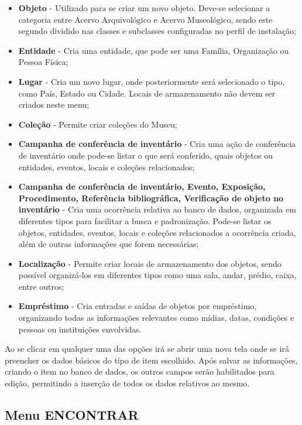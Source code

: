 \documentclass[a4paper,12pt,oneside,onecolumn,final,fleqn]{repUERJ}
\begin{document}
\begin{itemize}
	\item \textbf{Objeto} - Utilizado para se criar um novo objeto. Deve-se selecionar a categoria entre Acervo Arquivológico e Acervo Museológico, sendo este segundo dividido nas classes e subclasses configuradas no perfil de instalação;
	\item \textbf{Entidade} - Cria uma entidade, que pode ser uma Família, Organização ou Pessoa Física;
	\item \textbf{Lugar} - Cria um novo lugar, onde posteriormente será selecionado o tipo, como País, Estado ou Cidade. Locais de armazenamento não devem ser criados neste menu;
	\item \textbf{Coleção} - Permite criar coleções do Museu;
	\item \textbf{Campanha de conferência de inventário} - Cria uma ação de conferência de inventário onde pode-se listar o que será conferido, quais objetos ou entidades, eventos, locais e coleções relacionados;
	\item \textbf{Campanha de conferência de inventário, Evento, Exposição, Procedimento, Referência bibliográfica, Verificação de objeto no inventário} - Cria uma ocorrência relativa ao banco de dados, organizada em diferentes tipos para facilitar a busca e padronização. Pode-se listar os objetos, entidades, eventos, locais e coleções relacionados a ocorrência criada, além de outras informações que forem necessárias;
	\item \textbf{Localização} - Permite criar locais de armazenamento dos objetos, sendo possível organizá-los em diferentes tipos como uma sala, andar, prédio, caixa, entre outros;
	\item \textbf{Empréstimo} - Cria entradas e saídas de objetos por empréstimo, organizando todas as informações relevantes como mídias, datas, condições e pessoas ou instituições envolvidas.
\end{itemize}

Ao se clicar em qualquer uma das opções irá se abrir uma nova tela onde se irá preencher os dados básicos do tipo de item escolhido. Após salvar as informações, criando o item no banco de dados, os outros campos serão habilitados para edição, permitindo a inserção de todos os dados relativos ao mesmo.

\subsection{Menu ENCONTRAR}
\end{document}
